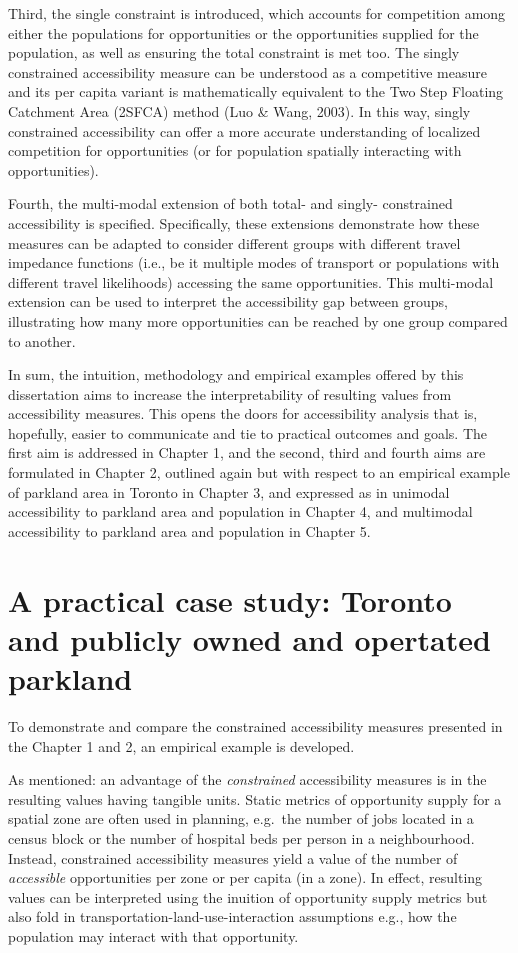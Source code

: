 \documentclass[
11pt, %
oneside, %
english, %
singlespacing, %
]{macthesis} %
\begin{document}
Third, the single constraint is introduced, which accounts for competition among either the populations for opportunities or the opportunities supplied for the population, as well as ensuring the total constraint is met too. The singly constrained accessibility measure can be understood as a competitive measure and its per capita variant is mathematically equivalent to the Two Step Floating Catchment Area (2SFCA) method (Luo \& Wang, 2003). In this way, singly constrained accessibility can offer a more accurate understanding of localized competition for opportunities (or for population spatially interacting with opportunities).

Fourth, the multi-modal extension of both total- and singly- constrained accessibility is specified. Specifically, these extensions demonstrate how these measures can be adapted to consider different groups with different travel impedance functions (i.e., be it multiple modes of transport or populations with different travel likelihoods) accessing the same opportunities. This multi-modal extension can be used to interpret the accessibility gap between groups, illustrating how many more opportunities can be reached by one group compared to another.

In sum, the intuition, methodology and empirical examples offered by this dissertation aims to increase the interpretability of resulting values from accessibility measures. This opens the doors for accessibility analysis that is, hopefully, easier to communicate and tie to practical outcomes and goals. The first aim is addressed in Chapter 1, and the second, third and fourth aims are formulated in Chapter 2, outlined again but with respect to an empirical example of parkland area in Toronto in Chapter 3, and expressed as in unimodal accessibility to parkland area and population in Chapter 4, and multimodal accessibility to parkland area and population in Chapter 5.

\section{A practical case study: Toronto and publicly owned and opertated parkland}\label{a-practical-case-study-toronto-and-publicly-owned-and-opertated-parkland}

To demonstrate and compare the constrained accessibility measures presented in the Chapter 1 and 2, an empirical example is developed.

As mentioned: an advantage of the \emph{constrained} accessibility measures is in the resulting values having tangible units. Static metrics of opportunity supply for a spatial zone are often used in planning, e.g.~the number of jobs located in a census block or the number of hospital beds per person in a neighbourhood. Instead, constrained accessibility measures yield a value of the number of \emph{accessible} opportunities per zone or per capita (in a zone). In effect, resulting values can be interpreted using the inuition of opportunity supply metrics but also fold in transportation-land-use-interaction assumptions e.g., how the population may interact with that opportunity.
\end{document}
